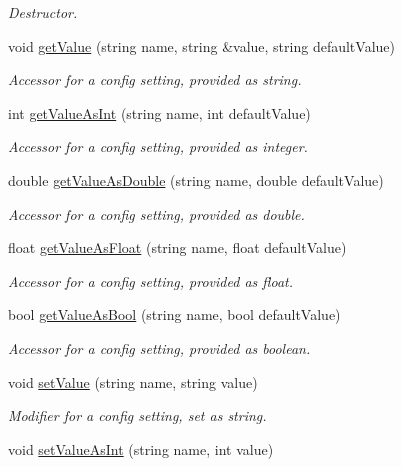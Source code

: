 \begin{DoxyCompactItemize}
\begin{DoxyCompactList}\small\item\em Destructor. \end{DoxyCompactList}\item 
void \hyperlink{class_config_a37d68b6ee7d75d4c8dce3bf2d1b846c7}{getValue} (string name, string \&value, string defaultValue)
\begin{DoxyCompactList}\small\item\em Accessor for a config setting, provided as string. \end{DoxyCompactList}\item 
int \hyperlink{class_config_a98c0ca609e4742569cd85e65d37bd083}{getValueAsInt} (string name, int defaultValue)
\begin{DoxyCompactList}\small\item\em Accessor for a config setting, provided as integer. \end{DoxyCompactList}\item 
double \hyperlink{class_config_a0d3270ea3610c65646f966ae4d4e0385}{getValueAsDouble} (string name, double defaultValue)
\begin{DoxyCompactList}\small\item\em Accessor for a config setting, provided as double. \end{DoxyCompactList}\item 
float \hyperlink{class_config_afd043b566281c38cd5ff27e722ff413f}{getValueAsFloat} (string name, float defaultValue)
\begin{DoxyCompactList}\small\item\em Accessor for a config setting, provided as float. \end{DoxyCompactList}\item 
bool \hyperlink{class_config_ac9303665c6adf9ca848b4fc9828132f6}{getValueAsBool} (string name, bool defaultValue)
\begin{DoxyCompactList}\small\item\em Accessor for a config setting, provided as boolean. \end{DoxyCompactList}\item 
void \hyperlink{class_config_ac002a7b310032004b98822d5ce3e5ea5}{setValue} (string name, string value)
\begin{DoxyCompactList}\small\item\em Modifier for a config setting, set as string. \end{DoxyCompactList}\item 
void \hyperlink{class_config_a97bd97713242319ce7adf698b1ef0af1}{setValueAsInt} (string name, int value)

\end{DoxyCompactItemize}
